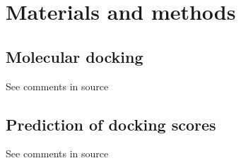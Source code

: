 \section{Materials and methods}

\subsection{Molecular docking}
See comments in source

\subsection{Prediction of docking scores}
See comments in source


